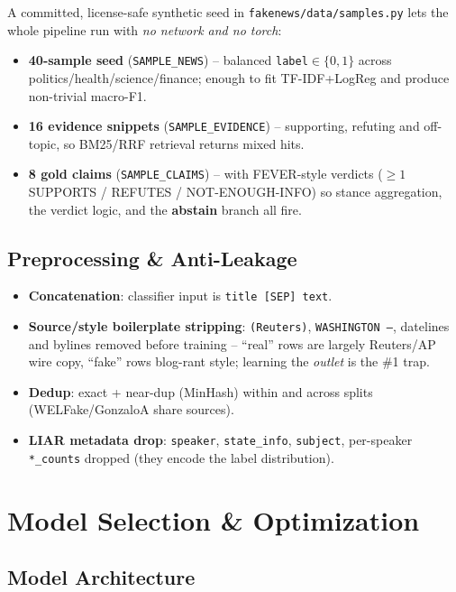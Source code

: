 \documentclass[12pt,a4paper]{article}
\begin{document}
A committed, license-safe synthetic seed in \texttt{fakenews/data/samples.py} lets the whole pipeline run with \emph{no network and no torch}:
\begin{itemize}
  \item \textbf{40-sample seed} (\texttt{SAMPLE\_NEWS}) -- balanced \texttt{label}$\in\{0,1\}$ across politics/health/science/finance; enough to fit TF-IDF+LogReg and produce non-trivial macro-F1.
  \item \textbf{16 evidence snippets} (\texttt{SAMPLE\_EVIDENCE}) -- supporting, refuting and off-topic, so BM25/RRF retrieval returns mixed hits.
  \item \textbf{8 gold claims} (\texttt{SAMPLE\_CLAIMS}) -- with FEVER-style verdicts ($\geq 1$ SUPPORTS / REFUTES / NOT-ENOUGH-INFO) so stance aggregation, the verdict logic, and the \textbf{abstain} branch all fire.
\end{itemize}

\subsection{Preprocessing \& Anti-Leakage}

\begin{itemize}\setlength\itemsep{0.15em}
  \item \textbf{Concatenation}: classifier input is \texttt{title [SEP] text}.
  \item \textbf{Source/style boilerplate stripping}: \texttt{(Reuters)}, \texttt{WASHINGTON --}, datelines and bylines removed before training -- ``real'' rows are largely Reuters/AP wire copy, ``fake'' rows blog-rant style; learning the \emph{outlet} is the \#1 trap.
  \item \textbf{Dedup}: exact + near-dup (MinHash) within and across splits (WELFake/GonzaloA share sources).
  \item \textbf{LIAR metadata drop}: \texttt{speaker}, \texttt{state\_info}, \texttt{subject}, per-speaker \texttt{*\_counts} dropped (they encode the label distribution).
\end{itemize}

\section{Model Selection \& Optimization}

\subsection{Model Architecture}
\end{document}
